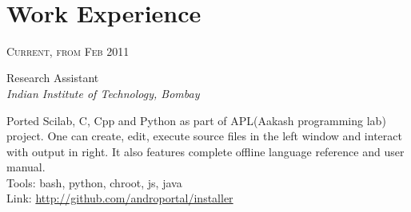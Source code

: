 \documentclass[10pt]{article} %
\begin{document}
\color{text1} %


\par{\\ %
	

\begin{minipage}[t]{0.5\textwidth} %
\vspace{0pt} %
	

\section{Work Experience} 


{\raggedleft\textsc{Current, from Feb 2011}\par}

{
\raggedright\large Research Assistant\\
\textit{Indian Institute of Technology, Bombay}\\[5pt]}


\normalsize{Ported Scilab, C, Cpp and Python as part of APL(Aakash programming lab) project. One can create, edit, execute source files in the left window and interact with output in right. It also features complete offline language reference and user manual.\\
Tools: bash, python, chroot, js, java\\
Link:  \href{http://github.com/androportal/installer}{http://github.com/androportal/installer}\\


}
\end{minipage}}
\end{document}
